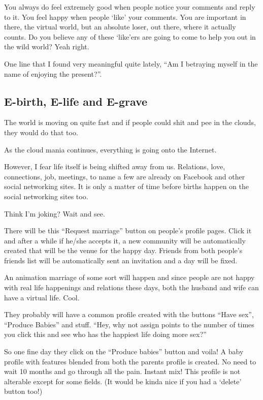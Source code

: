 \documentclass[twoside,11pt,titlepage]{article}
\begin{document}
You always do feel extremely good when people notice your comments and reply to it. You feel happy when people `like' your comments. You are important in there, the virtual world, but an absolute loser, out there, where it actually counts. Do you believe any of these `like'ers are going to come to help you out in the wild world? Yeah right.

One line that I found very meaningful quite lately, ``Am I betraying myself in the name of enjoying the present?''.

\newpage
\begin{center}
  \section{E-birth, E-life and E-grave}
\end{center}
\bigskip
\bigskip
\bigskip

The world is moving on quite fast and if people could shit and pee in the clouds, they would do that too.

As the cloud mania continues, everything is going onto the Internet.

However, I fear life itself is being shifted away from us. Relations, love, connections, job, meetings, to name a few are already on Facebook and other social networking sites. It is only a matter of time before births happen on the social networking sites too.

Think I'm joking? Wait and see.

There will be this ``Request marriage'' button on people's profile pages. Click it and after a while if he/she accepts it, a new community will be automatically created that will be the venue for the happy day. Friends from both people's friends list will be automatically sent an invitation and a day will be fixed.

An animation marriage of some sort will happen and since people are not happy with real life happenings and relations these days, both the husband and wife can have a virtual life. Cool.

They probably will have a common profile created with the buttons ``Have sex'', ``Produce Babies'' and stuff. ``Hey, why not assign points to the number of times you click this and see who has the happiest life doing more sex?''

So one fine day they click on the ``Produce babies'' button and voila! A baby profile with features blended from both the parents profile is created. No need to wait 10 months and go through all the pain. Instant mix! This profile is not alterable except for some fields. (It would be kinda nice if you had a `delete' button too!)
\end{document}
